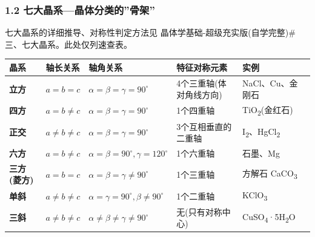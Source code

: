 \documentclass[a4paper,11pt]{ctexart}
\newcounter{none}
\newcommand{\箭}{\ensuremath{\rightarrow}}
\newcommand{\左箭}{\ensuremath{\leftarrow}}
\newcommand{\上箭}{\ensuremath{\uparrow}}
\newcommand{\下箭}{\ensuremath{\downarrow}}
\newcommand{\衡}{\ensuremath{\rightleftharpoons}}
\newcommand{\双箭}{\ensuremath{\leftrightarrow}}
\newcommand{\约等于}{\ensuremath{\approx}}
\newcommand{\小于等于}{\ensuremath{\leq}}
\newcommand{\大于等于}{\ensuremath{\geq}}
\newcommand{\不等于}{\ensuremath{\neq}}
\newcommand{\西格马}{\ensuremath{\sigma}}
\newcommand{\派}{\ensuremath{\pi}}
\begin{document}
\subsubsection{1.2 七大晶系---晶体分类的''骨架''}\label{ux4e03ux5927ux6676ux7cfbux6676ux4f53ux5206ux7c7bux7684ux9aa8ux67b6}

七大晶系的详细推导、对称性判定方法见 晶体学基础-超级充实版(自学完整)\#三、七大晶系。此处仅列速查表。

{\def\LTcaptype{none} %
\begin{longtable}[]{@{}
  >{\raggedright\arraybackslash}p{}
  >{\raggedright\arraybackslash}p{}
  >{\raggedright\arraybackslash}p{}
  >{\raggedright\arraybackslash}p{}
  >{\raggedright\arraybackslash}p{}@{}}
\toprule\noalign{}
\begin{minipage}[b]{\linewidth}\raggedright
晶系
\end{minipage} & \begin{minipage}[b]{\linewidth}\raggedright
轴长关系
\end{minipage} & \begin{minipage}[b]{\linewidth}\raggedright
轴角关系
\end{minipage} & \begin{minipage}[b]{\linewidth}\raggedright
特征对称元素
\end{minipage} & \begin{minipage}[b]{\linewidth}\raggedright
实例
\end{minipage} \\
\midrule\noalign{}
\endhead
\bottomrule\noalign{}
\endlastfoot
\textbf{立方} & \(a = b = c\) & \(\alpha = \beta = \gamma = 90^\circ\) & 4个三重轴(体对角线方向) & NaCl、Cu、金刚石 \\
\textbf{四方} & \(a = b \neq c\) & \(\alpha = \beta = \gamma = 90^\circ\) & 1个四重轴 & TiO\textsubscript{2}(金红石) \\
\textbf{正交} & \(a \neq b \neq c\) & \(\alpha = \beta = \gamma = 90^\circ\) & 3个互相垂直的二重轴 & I\textsubscript{2}、HgCl\textsubscript{2} \\
\textbf{六方} & \(a = b \neq c\) & \(\alpha = \beta = 90^\circ, \gamma = 120^\circ\) & 1个六重轴 & 石墨、Mg \\
\textbf{三方(菱方)} & \(a = b = c\) & \(\alpha = \beta = \gamma \neq 90^\circ\) & 1个三重轴 & 方解石 CaCO\textsubscript{3} \\
\textbf{单斜} & \(a \neq b \neq c\) & \(\alpha = \gamma = 90^\circ, \beta \neq 90^\circ\) & 1个二重轴 & KClO\textsubscript{3} \\
\textbf{三斜} & \(a \neq b \neq c\) & \(\alpha \neq \beta \neq \gamma \neq 90^\circ\) & 无(只有对称中心) & CuSO\textsubscript{4}·5H\textsubscript{2}O \\
\end{longtable}
}
\end{document}
